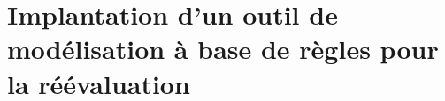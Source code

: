 \chapter[Implantation d'un outil de modélisation à base de règles pour la réévaluation]{Implantation d'un outil de modélisation à base de règles pour la réévaluation}
\label{cha:impl-outil-reevaluation}


